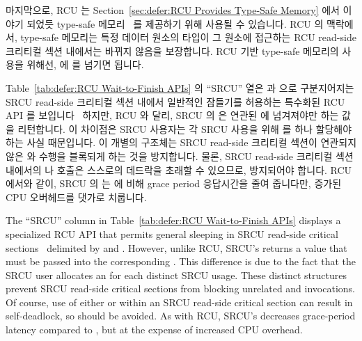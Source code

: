 마지막으로, RCU 는
Section~\ref{sec:defer:RCU Provides Type-Safe Memory} 에서 이야기 되었듯
type-safe 메모리~\cite{Cheriton96a} 를 제공하기 위해 사용될 수 있습니다.
RCU 의 맥락에서, type-safe 메모리는 특정 데이터 원소의 타입이 그 원소에
접근하는 RCU read-side 크리티컬 섹션 내에서는 바뀌지 않음을 보장합니다.
RCU 기반 type-safe 메모리의 사용을 위해선,  에
 를 넘기면 됩니다.

Table~\ref{tab:defer:RCU Wait-to-Finish APIs}
의 ``SRCU'' 열은  과  으로
구분지어지는 SRCU read-side 크리티컬 섹션 내에서 일반적인 잠들기를 허용하는
특수화된 RCU API 를 보입니다~\cite{PaulEMcKenney2006c}
하지만, RCU 와 달리, SRCU 의  은 연관된
 에 넘겨져야만 하는 값을 리턴합니다.
이 차이점은 SRCU 사용자는 각 SRCU 사용을 위해  를 하나 할당해야
하는 사실 때문입니다.
이 개별의  구조체는 SRCU read-side 크리티컬 섹션이 연관되지
않은  와  수행을
블록되게 하는 것을 방지합니다.
물론, SRCU read-side 크리티컬 섹션 내에서의  나
 호출은 스스로의 데드락을 초래할 수 있으므로,
방지되어야 합니다.
RCU 에서와 같이, SRCU 의  는
 에 비해 grace period 응답시간을 줄여 줍니다만, 증가된
CPU 오버헤드를 댓가로 치룹니다.

\iffalse

The ``SRCU'' column in
Table~\ref{tab:defer:RCU Wait-to-Finish APIs}
displays a specialized RCU API that permits general sleeping in SRCU
read-side critical
sections~\cite{PaulEMcKenney2006c}
delimited by  and .
However, unlike RCU, SRCU's  returns a value that
must be passed into the corresponding .
This difference is due to the fact that the SRCU user allocates an
 for each distinct SRCU usage.
These distinct  structures prevent SRCU read-side critical
sections from blocking unrelated  and
 invocations.
Of course, use of either  or
 within an SRCU read-side critical
section can result in self-deadlock, so should be avoided.
As with RCU, SRCU's  decreases
grace-period latency compared to , but at
the expense of increased CPU overhead.

